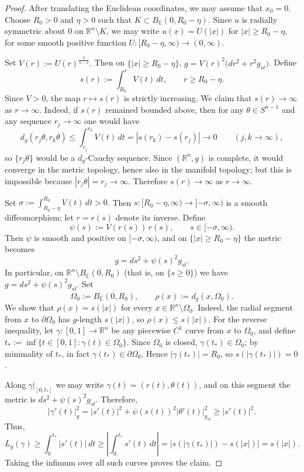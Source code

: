 \documentclass[12pt,oneside,a4paper]{article}
\theoremstyle{mytheorem}
\theoremstyle{remark}
\begin{document}
\begin{proof}
After translating the Euclidean coordinates, we may assume that $x_0=0$. Choose $R_0 > 0$ and $\eta > 0$ such that $K \subset B_{\mathbb{E}}(0, R_0 - \eta)$. Since $u$ is radially symmetric about $0$ on $\mathbb{R}^n \setminus K$, we may write
$u(x) = U(|x|) $ for $|x| \ge R_0 - \eta,$
for some smooth positive function $U \colon [R_0 - \eta, \infty) \to (0,\infty)$. 

Set $V(r):=U(r)^{\frac{2}{n-2}}.$ Then on $\{|x|\ge R_0-\eta\}$, $g=V(r)^2\bigl(dr^2+r^2g_{st}\bigr).$ Define
\[
s(r):=\int_{R_0}^r V(t)\,dt,\qquad r\ge R_0-\eta.
\]
Since $V>0$, the map $r\mapsto s(r)$ is strictly increasing. We claim that
$s(r)\to\infty$  as $r\to\infty.$
Indeed, if $s(r)$ remained bounded above, then for any $\theta\in S^{n-1}$ and any
sequence $r_j\to\infty$ one would have
\[
d_g(r_j\theta,r_k\theta)\le \int_{r_j}^{r_k}V(t)\,dt
=|s(r_k)-s(r_j)|\to 0
\qquad (j,k\to\infty),
\]
so $\{r_j\theta\}$ would be a $d_g$-Cauchy sequence. Since $(\mathbb R^n,g)$ is
complete, it would converge in the metric topology, hence also in the manifold
topology; but this is impossible because $|r_j\theta|=r_j\to\infty$.
Therefore $s(r)\to\infty$  as $r\to \infty$.

Set $\sigma:=\int_{R_0-\eta}^{R_0}V(t)\,dt>0.$ Then $s:[R_0-\eta,\infty)\longrightarrow[-\sigma,\infty)$
is a smooth diffeomorphism; let $r=r(s)$ denote its inverse. Define
\[
\psi(s):=V(r(s))\,r(s),\qquad s\in[-\sigma,\infty).
\]
Then $\psi$ is smooth and positive on $[-\sigma,\infty)$, and on
$\{|x|\ge R_0-\eta\}$ the metric becomes
\[
g=ds^2+\psi(s)^2g_{st}.
\]
In particular, on $\mathbb R^n\setminus \overline{B_{\mathbb E}(0,R_0)}$
(that is, on $\{s\ge 0\}$) we have $g=ds^2+\psi(s)^2g_{st}.$
Set
\[
\Omega_0:=\overline{B_{\mathbb E}(0,R_0)},
\qquad
\rho(x):=d_g(x,\Omega_0).
\]
We show that $\rho(x)=s(|x|)$ for every $x\in \mathbb R^n\setminus \Omega_0.$ Indeed, the radial segment from $x$ to $\partial\Omega_0$ has $g$-length $s(|x|)$, so
$\rho(x)\le s(|x|).$ For the reverse inequality, let $\gamma:[0,1]\to\mathbb R^n$ be any piecewise
$C^1$ curve from $x$ to $\Omega_0$, and define $t_*:=\inf\{t\in[0,1]:\gamma(t)\in\Omega_0\}.$
Since $\Omega_0$ is closed, $\gamma(t_*)\in\Omega_0$; by minimality of $t_*$,
in fact $\gamma(t_*)\in\partial\Omega_0$. Hence $|\gamma(t_*)|=R_0$, so
$s(|\gamma(t_*)|)=0$.

Along $\gamma|_{[0,t_*]}$ we may write $\gamma(t)=(r(t),\theta(t))$, and on this
segment the metric is $ds^2+\psi(s)^2g_{st}$. Therefore,
\[
|\gamma'(t)|_g^2
=
|s'(t)|^2+\psi(s(t))^2|\theta'(t)|_{g_{st}}^2
\ge |s'(t)|^2.
\]
Thus,
\[
L_g(\gamma)\ge \int_0^{t_*}|s'(t)|\,dt
\ge \left|\int_0^{t_*} s'(t)\,dt\right|
=|s(|\gamma(t_*)|)-s(|x|)|
=s(|x|).
\]
Taking the infimum over all such curves proves the claim.


\end{proof}
\end{document}

